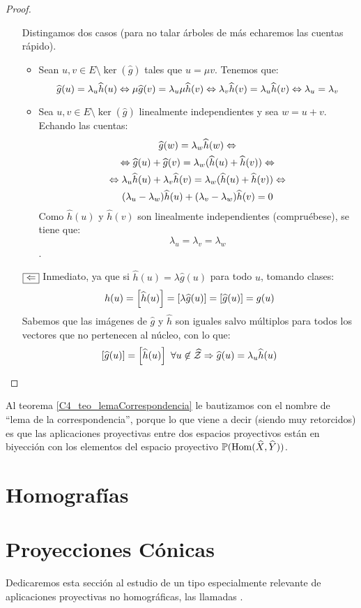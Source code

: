\begin{proof}
\begin{itemize}
		Distingamos dos casos (para no talar árboles de más echaremos las cuentas rápido).
		\begin{itemize}
			\item Sean $u,v\in E\setminus\ker(\widehat{g})$ tales que $u=\mu v$. Tenemos que:
			\[
			\widehat{g}(u)=\lambda_u\widehat{h}(u)
			\Leftrightarrow\mu\widehat{g}(v)=\lambda_u\mu\widehat{h}(v)\Leftrightarrow\lambda_v\widehat{h}(v)=\lambda_u\widehat{h}(v)\Leftrightarrow\lambda_u=\lambda_v
			\]
			\item Sea $u,v\in E\setminus\ker(\widehat{g})$ linealmente independientes y sea $w=u+v$. Echando las cuentas:
			\begin{multline}\widehat{g}(w)=\lambda_w\widehat{h}(w)\Leftrightarrow\\\Leftrightarrow\widehat{g}(u)+\widehat{g}(v)=\lambda_w(\widehat{h}(u)+\widehat{h}(v))\Leftrightarrow\\
			\Leftrightarrow \lambda_u\widehat{h}(u)+\lambda_v\widehat{h}(v)=\lambda_w(\widehat{h}(u)+\widehat{h}(v))\Leftrightarrow\\
			(\lambda_u-\lambda_w)\widehat{h}(u)+(\lambda_v-\lambda_w)\widehat{h}(v)=0\end{multline}
			Como $\widehat{h}(u)$ y $\widehat{h}(v)$ son linealmente independientes (compruébese), se tiene que: \[\lambda_u=\lambda_v=\lambda_w\].
		\end{itemize}
		\item[$\fbox{$\Leftarrow$}$] Inmediato, ya que si $\widehat{h}(u)=\lambda\widehat{g}(u)$ para todo $u$, tomando clases:
		\[h(u)=\left [ \widehat{h}(u) \right ]=\left [ \lambda\widehat{g}(u) \right ]=\left [ \widehat{g}(u) \right ]=g(u)\]
		Sabemos que las imágenes de $\widehat{g}$ y $\widehat{h}$ son iguales salvo múltiplos para todos los vectores que no pertenecen al núcleo, con lo que:
		\[\class{\widehat{g}(u)}=\class{\widehat{h}(u)}\ \forall u\not\in\widehat{\mc{Z}}\ra\widehat{g}(u)=\lambda_u\widehat{h}(u)\]
	\end{itemize}
\end{proof}
Al teorema \ref{C4_teo_lemaCorrespondencia} le bautizamos con el nombre de ``lema de la correspondencia'', porque lo que viene a decir (siendo muy retorcidos) es que las aplicaciones proyectivas entre dos espacios proyectivos están en biyección con los elementos del espacio proyectivo $\mathbb{P}(\mathrm{Hom}(\widehat{X},\widehat{Y}))$.
\section{Homografías}
\section{Proyecciones Cónicas}
Dedicaremos esta sección al estudio de un tipo especialmente relevante de aplicaciones proyectivas no homográficas, las llamadas .

